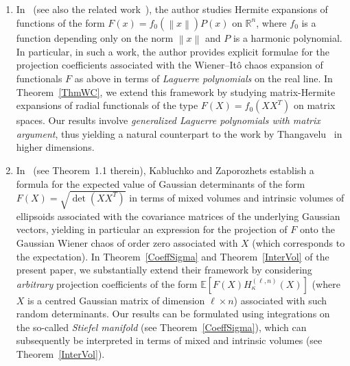\documentclass[10pt]{amsart}
\theoremstyle{definition}\newtheorem{defi}[theo]{Definition}\newtheorem{rema}[theo]{Remark}\newtheorem{exam}[theo]{Example}\newtheorem{exem}[theo]{Example}\newtheorem{nota}[theo]{Notation}
\newcommand{\R}{\mathbb{R}}
\newcommand{\norm}[1]{\left\lVert#1\right\rVert}
\newcommand*{\alphenumi}{\renewcommand*{\theenumi}{\alph{enumi}}}
\begin{document}
\begin{enumerate}\alphenumi
\item In~\cite{Thangavelu} (see also the related work~\cite{Kochneff}), the author studies Hermite expansions of functions of the form $F(x)=f_0(\norm{x})P(x)$ on $\R^n$, where $f_0$ is a function depending only on the norm $\norm{x}$ and $P$ is a harmonic polynomial. In particular, in such a work, the author provides explicit formulae for the projection coefficients associated with the Wiener--Itô chaos expansion of functionals $F$ as above in terms of \emph{Laguerre polynomials} on the real line. In Theorem~\ref{ThmWC}, we extend this framework by studying matrix-Hermite expansions of radial functionals of the type $F(X) = f_0(XX^T)$ on matrix spaces. Our results involve \emph{generalized Laguerre polynomials with matrix argument}, thus yielding a natural counterpart to the work by Thangavelu~\cite{Thangavelu} in higher dimensions.
\item In~\cite{Kab14} (see Theorem~1.1 therein), Kabluchko and Zaporozhets establish a formula for the expected value of Gaussian determinants of the form $F(X) = \sqrt{\det(XX^T)}$ in terms of mixed volumes and intrinsic volumes of ellipsoids associated with the covariance matrices of the underlying Gaussian vectors, yielding in particular an expression for the projection of $F$ onto the Gaussian Wiener chaos of order zero associated with $X$ (which corresponds to the expectation). In Theorem~\ref{CoeffSigma} and Theorem~\ref{InterVol} of the present paper, we substantially extend their framework by considering \emph{arbitrary} projection coefficients of the form $\mathbb{E}[F(X) H_{\kappa}^{(\ell,n)}(X)]$ (where $X$ is a centred Gaussian matrix of dimension $\ell \times n$) associated with such random determinants. Our results can be formulated using integrations on the so-called \emph{Stiefel manifold} (see Theorem~\ref{CoeffSigma}), which can subsequently be interpreted in terms of mixed and intrinsic volumes (see Theorem~\ref{InterVol}).


\end{enumerate}
\end{document}
